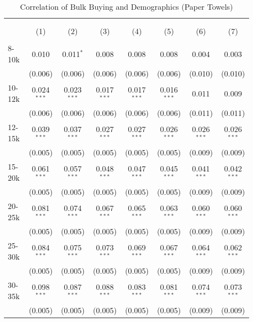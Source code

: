 
\begin{table}[!htbp] \centering 
  \caption{Correlation of Bulk Buying and Demographics (Paper Towels)} 
  \label{tab:discountingBehavior7734} 
\begin{tabular}{@{\extracolsep{5pt}}lccccccc} 
\\[-1.8ex]\hline 
\hline \\[-1.8ex] 
\\[-1.8ex] & (1) & (2) & (3) & (4) & (5) & (6) & (7)\\ 
\hline \\[-1.8ex] 
 8-10k & 0.010 & 0.011$^{*}$ & 0.008 & 0.008 & 0.008 & 0.004 & 0.003 \\ 
  & (0.006) & (0.006) & (0.006) & (0.006) & (0.006) & (0.010) & (0.010) \\ 
  10-12k & 0.024$^{***}$ & 0.023$^{***}$ & 0.017$^{***}$ & 0.017$^{***}$ & 0.016$^{***}$ & 0.011 & 0.009 \\ 
  & (0.006) & (0.006) & (0.006) & (0.006) & (0.006) & (0.011) & (0.011) \\ 
  12-15k & 0.039$^{***}$ & 0.037$^{***}$ & 0.027$^{***}$ & 0.027$^{***}$ & 0.026$^{***}$ & 0.026$^{***}$ & 0.026$^{***}$ \\ 
  & (0.005) & (0.005) & (0.005) & (0.005) & (0.005) & (0.009) & (0.009) \\ 
  15-20k & 0.061$^{***}$ & 0.057$^{***}$ & 0.048$^{***}$ & 0.047$^{***}$ & 0.045$^{***}$ & 0.041$^{***}$ & 0.042$^{***}$ \\ 
  & (0.005) & (0.005) & (0.005) & (0.005) & (0.005) & (0.009) & (0.009) \\ 
  20-25k & 0.081$^{***}$ & 0.074$^{***}$ & 0.067$^{***}$ & 0.065$^{***}$ & 0.063$^{***}$ & 0.060$^{***}$ & 0.060$^{***}$ \\ 
  & (0.005) & (0.005) & (0.005) & (0.005) & (0.005) & (0.009) & (0.009) \\ 
  25-30k & 0.084$^{***}$ & 0.075$^{***}$ & 0.073$^{***}$ & 0.069$^{***}$ & 0.067$^{***}$ & 0.064$^{***}$ & 0.062$^{***}$ \\ 
  & (0.005) & (0.005) & (0.005) & (0.005) & (0.005) & (0.009) & (0.009) \\ 
  30-35k & 0.098$^{***}$ & 0.087$^{***}$ & 0.088$^{***}$ & 0.083$^{***}$ & 0.081$^{***}$ & 0.074$^{***}$ & 0.073$^{***}$ \\ 
  & (0.005) & (0.005) & (0.005) & (0.005) & (0.005) & (0.009) & (0.009) \\ 

\end{tabular}
\end{table}
